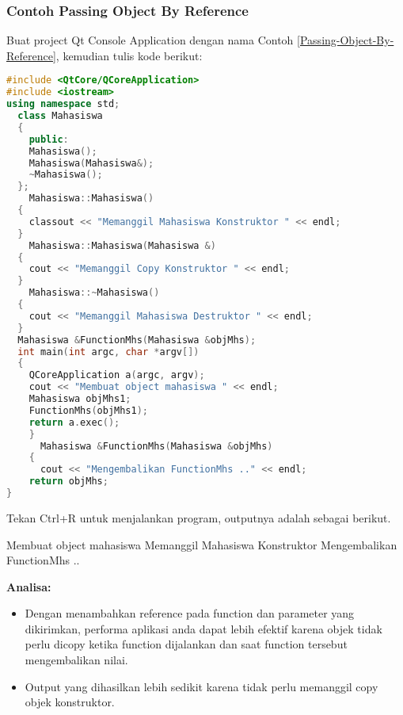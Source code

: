 \subsubsection*{Contoh  Passing Object By Reference}

Buat project Qt Console Application dengan nama Contoh \ref{Passing-Object-By-Reference}, kemudian
tulis kode berikut:

\begin{lstlisting}[language=c++, caption=Passing Object By Reference, label=Passing-Object-By-Reference]
#include <QtCore/QCoreApplication>
#include <iostream>
using namespace std;
  class Mahasiswa
  {
    public:
    Mahasiswa();
    Mahasiswa(Mahasiswa&);
    ~Mahasiswa();
  };
    Mahasiswa::Mahasiswa()
  {
    classout << "Memanggil Mahasiswa Konstruktor " << endl;
  }
    Mahasiswa::Mahasiswa(Mahasiswa &)
  {
    cout << "Memanggil Copy Konstruktor " << endl;
  }
    Mahasiswa::~Mahasiswa()
  {
    cout << "Memanggil Mahasiswa Destruktor " << endl;
  }
  Mahasiswa &FunctionMhs(Mahasiswa &objMhs);
  int main(int argc, char *argv[])
  {
    QCoreApplication a(argc, argv);
    cout << "Membuat object mahasiswa " << endl;
    Mahasiswa objMhs1;
    FunctionMhs(objMhs1);
    return a.exec();
    }
      Mahasiswa &FunctionMhs(Mahasiswa &objMhs)
    {
      cout << "Mengembalikan FunctionMhs .." << endl;
    return objMhs;
}
\end{lstlisting}

Tekan Ctrl+R untuk menjalankan program, outputnya adalah sebagai
berikut.

\begin{lcverbatim}
Membuat object mahasiswa
Memanggil Mahasiswa Konstruktor
Mengembalikan FunctionMhs ..
\end{lcverbatim}

\textbf{Analisa:}

\begin{itemize}

\item
  Dengan menambahkan reference pada function dan parameter yang
  dikirimkan, performa aplikasi anda dapat lebih efektif karena objek
  tidak perlu dicopy ketika function dijalankan dan saat function
  tersebut mengembalikan nilai.
\item
  Output yang dihasilkan lebih sedikit karena tidak perlu memanggil copy
  objek konstruktor.
\end{itemize}

